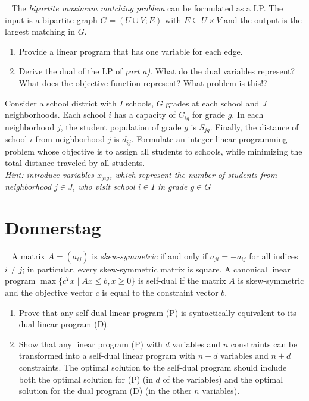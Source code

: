 \documentclass{uebung_cs}
\begin{document}
\begin{aufgabe}\
	The \emph{bipartite maximum matching problem} can be formulated as a \acs{LP}. The input is a bipartite graph $G=(U\cup V;E)$ with $E \subseteq U \times V$ and the output is the largest matching in $G$.
	\begin{enumerate}
		\item Provide a linear program that has one variable for each edge.
		\item Derive the dual of the \acs{LP} of \emph{part a)}. What do the dual variables represent? What does the objective function represent? What problem is this!?
	\end{enumerate}
\end{aufgabe}


\begin{aufgabe}
	Consider a school district with $I$ schools, $G$ grades at each school and $J$ neighborhoods. Each school $i$ has a capacity of $C_{ig}$ for grade $g$. In each neighborhood $j$, the student population of grade $g$ is $S_{jg}$. Finally, the distance of school $i$ from neighborhood $j$ is $d_{ij}$. Formulate an integer linear programming problem whose objective is to assign all students to schools, while minimizing the total distance traveled by all students.\\
	\emph{Hint: introduce variables $x_{jig}$, which represent the number of students from neighborhood $j \in J$, who visit school $i \in I$ in grade $g \in G$}
\end{aufgabe}

\section*{Donnerstag}

\begin{aufgabe}\
	A matrix $A=(a_{ij})$ is \emph{skew-symmetric} if and only if $a_{ji} = −a_{ij}$ for all indices $i \neq j$; in particular, every skew-symmetric matrix is square. A canonical linear program $\max\{c^T x  \; | \; Ax \leq b, x \geq 0\}$ is self-dual if the matrix $A$ is skew-symmetric and the objective vector $c$ is equal to the constraint vector $b$.
	\begin{enumerate}
		\item Prove that any self-dual linear program (P) is syntactically equivalent to its dual linear program (D).
		\item Show that any linear program (P) with $d$ variables and $n$ constraints can be transformed into a self-dual linear program with $n + d$ variables and $n + d$ constraints. The optimal solution to the self-dual program should include both the optimal solution for (P) (in $d$ of the variables) and the optimal solution for the dual program (D) (in the other $n$ variables).
	\end{enumerate}
\end{aufgabe}
\end{document}
